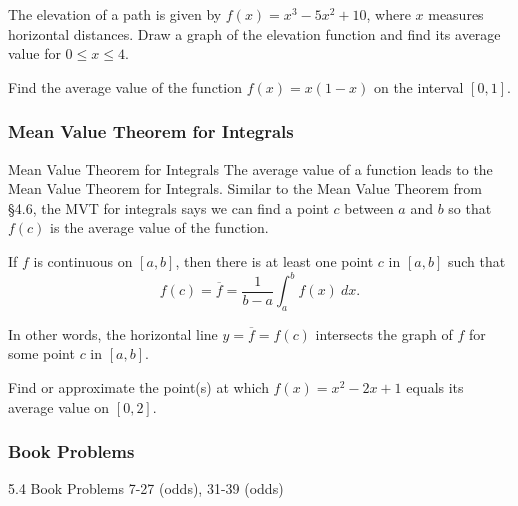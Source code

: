 \documentclass[cal1spr16Lectures.tex]{subfiles}
\begin{document}
\begin{frame}\small
\begin{ex}
The elevation of a path is given by $f(x)=x^3-5x^2+10$, where $x$ measures horizontal distances.  Draw a graph of the elevation function and find its average value for $0\leq x\leq 4$.
\end{ex}
\begin{exe} 
Find the average value of the function $f(x)=x(1-x)$ on the interval $[0,1]$. 
\end{exe}
\end{frame}

\subsubsection{Mean Value Theorem for Integrals}

\begin{frame}{\small Mean Value Theorem for Integrals}\footnotesize
The average value of a function leads to the Mean Value Theorem for Integrals.  Similar to the Mean Value Theorem from \S 4.6, the MVT for integrals says we can find a point $c$ between $a$ and $b$ so that $f(c)$ is the average value of the function.
\begin{thm} 
If $f$ is continuous on $[a,b]$, then there is at least one point $c$ in $[a,b]$ such that 
\[f(c)=\overline{f}=\frac{1}{b-a} \int_a^b f(x)\ dx.\]
\end{thm}
In other words, the horizontal line $y=\overline{f}=f(c)$ intersects the graph of $f$ for some point $c$ in $[a,b]$. 
\end{frame}

\begin{frame}
\begin{exe} 
Find or approximate the point(s) at which $f(x)=x^2-2x+1$ equals its average value on $[0,2]$. 
\end{exe}
\end{frame}

\subsubsection{Book Problems}

\begin{frame}
\begin{block}{5.4 Book Problems}
7-27 (odds), 31-39 (odds)
\end{block}
\end{frame}
\end{document}
